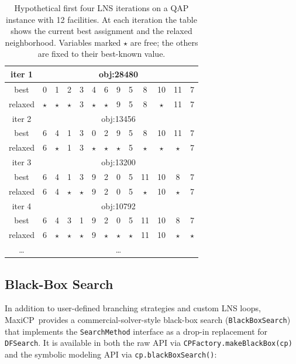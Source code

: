 \documentclass[11pt, a4paper]{scrartcl}
\newcommand{\maxicp}{\textsf{MaxiCP}}
\begin{document}
\begin{table}[t]
\centering
\begin{tabular}{|c|c|c|c|c|c|c|c|c|c|c|c|c|} \hline
iter 1 & \multicolumn{12}{c|}{obj:28480} \\  \hline
best    & 0& 1& 2& 3& 4& 6& 9& 5& 8&10&11& 7  \\ \hline
relaxed & $\star$& $\star$& $\star$& 3& $\star$& $\star$& 9& 5& 8& $\star$&11& 7  \\ \hline \hline
iter 2 & \multicolumn{12}{c|}{obj:13456} \\  \hline
best    & 6& 4& 1& 3& 0& 2& 9& 5& 8&10&11& 7  \\ \hline
relaxed & 6& $\star$& 1& 3& $\star$& $\star$& $\star$& 5& $\star$& $\star$& $\star$& 7  \\ \hline \hline
iter 3 & \multicolumn{12}{c|}{obj:13200} \\  \hline
best    & 6& 4& 1& 3& 9& 2& 0& 5&11&10& 8& 7  \\ \hline
relaxed & 6& 4& $\star$& $\star$& 9& 2& 0& 5& $\star$&10& $\star$& 7  \\ \hline \hline
iter 4 & \multicolumn{12}{c|}{obj:10792} \\  \hline
best    & 6& 4& 3& 1& 9& 2& 0& 5&11&10& 8& 7  \\ \hline
relaxed & 6& $\star$& $\star$& $\star$& 9& $\star$& $\star$& $\star$&11&10& $\star$& $\star$  \\ \hline \hline
\ldots & \multicolumn{12}{c|}{\ldots} \\  \hline
\end{tabular}
\caption{Hypothetical first four LNS iterations on a QAP instance with 12 facilities. At each iteration the table shows the current best assignment and the relaxed neighborhood. Variables marked $\star$ are free; the others are fixed to their best-known value.}
\label{tab:lns}
\end{table}

\subsection{Black-Box Search}
\label{sec:blackbox}

In addition to user-defined branching strategies and custom LNS loops, \maxicp\ provides a commercial-solver-style black-box search (\texttt{BlackBoxSearch}) that implements the \texttt{SearchMethod} interface as a drop-in replacement for \texttt{DFSearch}.
It is available in both the raw API via \texttt{CPFactory.makeBlackBox(cp)} and the symbolic modeling API via \texttt{cp.blackBoxSearch()}:
\end{document}
